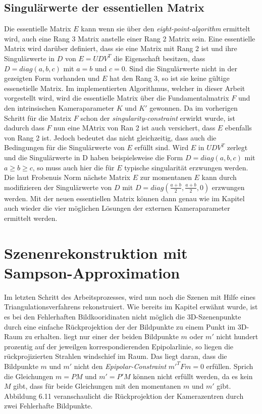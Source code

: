 \pagebreak

\subsection{Singulärwerte der essentiellen Matrix}

Die essentielle Matrix $E$ kann wenn sie über den \textit{eight-point-algorithm} ermittelt wird, auch eine Rang 3 Matrix anstelle einer Rang 2 Matrix sein. Eine essentielle Matrix wird darüber definiert, dass sie eine Matrix mit Rang 2 ist und ihre Singulärwerte in $D$ von $E = UDV^T$ die Eigenschaft besitzen, dass $ D = diag(a,b,c)$ mit $a=b$ und $c=0$. Sind die Singulärwerte nicht in der gezeigten Form vorhanden und $E$ hat den Rang 3, so ist sie keine gültige essenetielle Matrix\cite{HZ}. Im implementierten Algorithmus, welcher in dieser Arbeit vorgestellt wird, wird die essentielle Matrix über die Fundamentalmatrix $F$ und den intrinsischen Kameraparameter $K$ und $K'$ gewonnen. Da im vorherigen Schritt für die Matrix $F$ schon der \textit{singularity-constraint} erwirkt wurde, ist dadurch dass $F$ nun eine MAtrix von Ran 2 ist auch versichert, dass $E$ ebenfalls von Rang 2 ist. Jedoch bedeutet das nicht gleichzeitig, dass auch die Bedingungen für die Singulärwerte von $E$ erfüllt sind. Wird $E$ in $UDV^T$ zerlegt und die Singulärwerte in D haben beispielsweise die Form $D= diag(a,b,c)$ mit $a \geq b \geq c $, so muss auch hier die für $E$ typische singularität erzwungen werden. Die laut Frobenuis Norm nächste Matrix $E$ zur momentanen $E$ kann durch modifizieren der Singulärwerte von $D$ mit $D=diag(\frac{a+b}{2},\frac{a+b}{2},0)$ erzwungen werden\cite{HZ}. Mit der neuen essentiellen Matrix können dann genau wie im Kapitel  auch wieder die vier möglichen Lösungen der externen Kameraparameter ermittelt werden. 

\section{Szenenrekonstruktion mit Sampson-Approximation}

Im letzten Schritt des Arbeitsprozesses, wird nun noch die Szenen mit Hilfe eines Triangulationsverfahrens rekonstruiert. Wie bereits im Kapitel  erwähnt wurde, ist es bei den Fehlerhaften Bildkooridinaten nicht möglich die 3D-Szenenpunkte durch eine einfache Rückprojektion der der Bildpunkte zu einem Punkt im 3D-Raum zu erhalten. liegt nur einer der beiden Bildpunkte $m$ oder $m'$ nicht hundert prozentig auf der jeweilgen korrespondierenden Epipolarlinie, so liegen die rückprojizierten Strahlen windschief im Raum. Das liegt daran, dass die Bildpunkte $m$ und $m'$ nicht den \textit{Epipolar-Constraint} $m'^T F m = 0$ erfüllen. Sprich die Gleichungen $m = PM$ und $m' = P'M$ können nicht erfüllt werden, da es kein $M$ gibt, dass für beide Gleichungen mit den momentanen $m$ und $m'$ gibt. Abbildung 6.11 veranschaulicht die Rückprojektion der Kamerazentren durch zwei Fehlerhafte Bildpunkte. 


